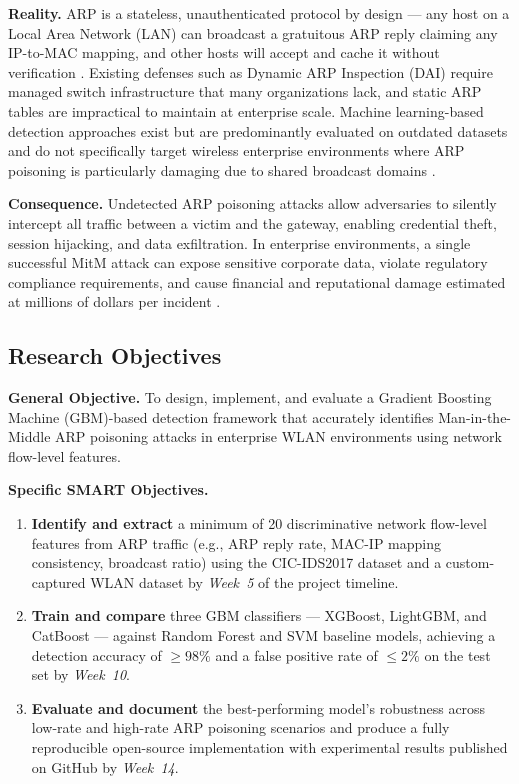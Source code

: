 \documentclass[12pt,a4paper]{article}
\begin{document}
\textbf{Reality.}
ARP is a stateless, unauthenticated protocol by design --- any host on a Local
Area Network (LAN) can broadcast a gratuitous ARP reply claiming any IP-to-MAC
mapping, and other hosts will accept and cache it without verification \cite{tripathi2022}.
Existing defenses such as Dynamic ARP Inspection (DAI) require managed switch
infrastructure that many organizations lack, and static ARP tables are impractical
to maintain at enterprise scale. Machine learning-based detection approaches exist
but are predominantly evaluated on outdated datasets and do not specifically target
wireless enterprise environments where ARP poisoning is particularly damaging due
to shared broadcast domains \cite{ahmed2023}.

\textbf{Consequence.}
Undetected ARP poisoning attacks allow adversaries to silently intercept all
traffic between a victim and the gateway, enabling credential theft, session
hijacking, and data exfiltration. In enterprise environments, a single successful
MitM attack can expose sensitive corporate data, violate regulatory compliance
requirements, and cause financial and reputational damage estimated at millions
of dollars per incident \cite{alotaibi2023}.

\subsection{Research Objectives}

\textbf{General Objective.}
To design, implement, and evaluate a Gradient Boosting Machine (GBM)-based
detection framework that accurately identifies Man-in-the-Middle ARP poisoning
attacks in enterprise WLAN environments using network flow-level features.

\textbf{Specific SMART Objectives.}
\begin{enumerate}[label=\textbf{SO\arabic*.}, leftmargin=*, itemsep=4pt]
    \item \textbf{Identify and extract} a minimum of 20 discriminative network
          flow-level features from ARP traffic (e.g., ARP reply rate, MAC-IP
          mapping consistency, broadcast ratio) using the CIC-IDS2017 dataset
          and a custom-captured WLAN dataset by \textit{Week~5} of the project
          timeline.
    \item \textbf{Train and compare} three GBM classifiers --- XGBoost, LightGBM,
          and CatBoost --- against Random Forest and SVM baseline models, achieving
          a detection accuracy of $\geq 98\%$ and a false positive rate of
          $\leq 2\%$ on the test set by \textit{Week~10}.
    \item \textbf{Evaluate and document} the best-performing model's robustness
          across low-rate and high-rate ARP poisoning scenarios and produce a
          fully reproducible open-source implementation with experimental results
          published on GitHub by \textit{Week~14}.
\end{enumerate}
\end{document}
